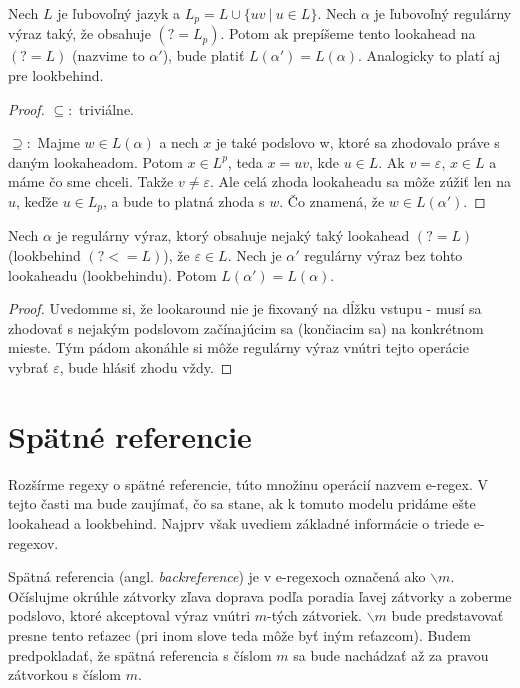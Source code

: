 \begin{veta}\label{bezprefixove}
Nech $L$ je ľubovoľný jazyk a $L_p = L \cup \lbrace uv ~|~ u \in L \rbrace$. Nech $\alpha$ je ľubovoľný regulárny výraz taký, že obsahuje $(?=L_p)$. Potom ak prepíšeme tento lookahead na $(?=L)$ (nazvime to $\alpha '$), bude platiť $L(\alpha ') = L(\alpha )$. Analogicky to platí aj pre lookbehind.
\end{veta}
\begin{proof}
$\subseteq :$ triviálne.

$\supseteq :$ Majme $w \in L(\alpha)$ a nech $x$ je také podslovo w, ktoré sa zhodovalo práve s daným lookaheadom. Potom $x \in L^p$, teda $x=uv$, kde $u \in L$. Ak $v=\varepsilon$, $x \in L$ a máme čo sme chceli. Takže $v\neq \varepsilon$. Ale celá zhoda lookaheadu sa môže zúžiť len na $u$, keďže $u \in L_p$, a bude to platná zhoda s $w$. Čo znamená, že $w \in L(\alpha ')$.
\end{proof}

\begin{veta}
Nech $\alpha$ je regulárny výraz, ktorý obsahuje nejaký taký lookahead $(?=L)$ (lookbehind $(?<=L)$), že $\varepsilon \in L$. Nech je $\alpha '$ regulárny výraz bez tohto lookaheadu (lookbehindu). Potom $L(\alpha ') = L(\alpha)$.
\end{veta}
\begin{proof}
Uvedomme si, že lookaround nie je fixovaný na dĺžku vstupu - musí sa zhodovať s nejakým podslovom začínajúcim sa (končiacim sa) na konkrétnom mieste. Tým pádom akonáhle si môže regulárny výraz vnútri tejto operácie vybrať $\varepsilon$, bude hlásiť zhodu vždy.
\end{proof}

\section{Spätné referencie}\label{chap:backref}

Rozšírme regexy o spätné referencie, túto množinu operácií nazvem e-regex. V tejto časti ma bude zaujímať, čo sa stane, ak k tomuto modelu pridáme ešte lookahead a lookbehind. Najprv však uvediem základné informácie o triede e-regexov.

Spätná referencia (angl. \textit{backreference}) je v e-regexoch označená ako $ \backslash m $. O\-čís\-luj\-me okrúhle zátvorky zľava doprava podľa poradia ľavej zátvorky a zoberme podslovo, ktoré akceptoval výraz vnútri $m$-tých zátvoriek. $ \backslash m $ bude predstavovať presne tento reťazec (pri inom slove teda môže byť iným reťazcom). Budem predpokladať, že spätná referencia s číslom $m$ sa bude nachádzať až za pravou zátvorkou s číslom $m$.

